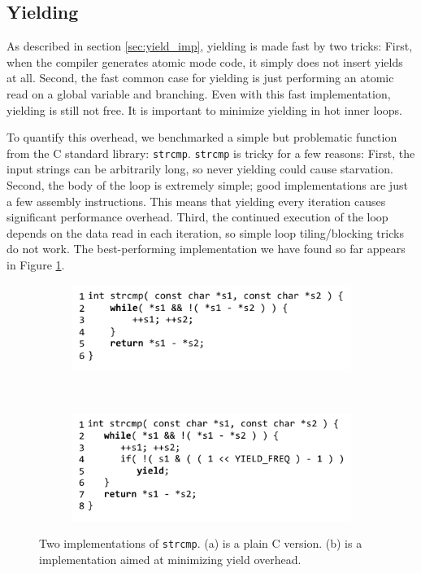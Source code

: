 \documentclass[preprint, 10pt, numbers]{sigplanconf}
\begin{document}
\subsection{Yielding}

As described in section \ref{sec:yield_imp}, yielding is made fast by two tricks:
First, when the compiler generates atomic mode code, it simply does not insert yields at all.
Second, the fast common case for yielding is just performing an atomic read on a global variable and branching.
Even with this fast implementation, yielding is still not free.
It is important to minimize yielding in hot inner loops.

To quantify this overhead, we benchmarked a simple but problematic function from the C standard library: \texttt{strcmp}.
\texttt{strcmp} is tricky for a few reasons:
First, the input strings can be arbitrarily long, so never yielding could cause starvation.
Second, the body of the loop is extremely simple; good implementations are just a few assembly instructions.
This means that yielding every iteration causes significant performance overhead.
Third, the continued execution of the loop depends on the data read in each iteration, so simple loop tiling/blocking tricks do not work.
The best-performing implementation we have found so far appears in Figure \ref{fig:strcmp}.

\begin{figure}
    \centering
    \begin{subfigure}[b]{0.3\textwidth}
        \hspace{-1.5cm}
        \includegraphics{plain_strcmp}
        \caption{}
    \end{subfigure}
    ~ %
    \begin{subfigure}[b]{0.3\textwidth}
        \hspace{-1.5cm}
        \includegraphics{strcmp_benchmark}
        \caption{}
    \end{subfigure}
    \caption{Two implementations of \texttt{strcmp}.
      (a) is a plain C version.
      (b) is a \charcoal{} implementation aimed at minimizing yield overhead. }
    \label{fig:strcmp}
\end{figure}
\end{document}
